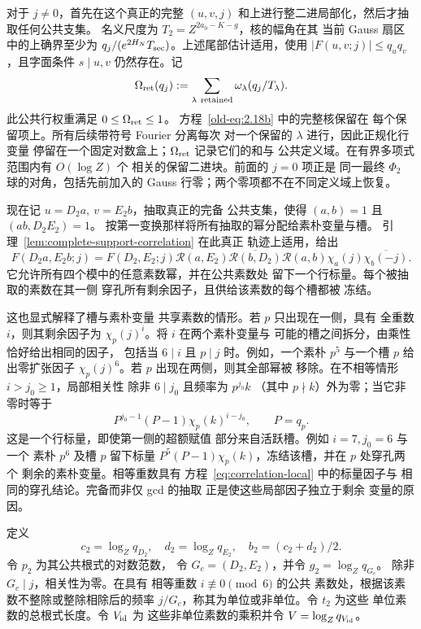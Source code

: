 对于 \(j\ne0\)，首先在这个真正的完整
\((u,v,j)\) 和上进行整二进局部化，然后才抽取任何公共支集。
名义尺度为
\(T_2=Z^{2a_0-K-g}\)，核的幅角在其
当前 Gauss 扇区中的上确界至少为
\(q_j/(e^{2H_N}T_{\rm sec})\)。上述尾部估计适用，使用
\(|F(u,v;j)|\le q_uq_v\)，且字面条件
\(s\mid u,v\) 仍然存在。记
\[
 \Omega_{\rm ret}(q_j)
 :=\sum_{\lambda\ {\rm retained}}\omega_\lambda(q_j/T_\lambda).
\]
此公共行权重满足 \(0\le\Omega_{\rm ret}\le1\)。
方程~\eqref{old-eq:2.18b} 中的完整核保留在
每个保留项上。所有后续带符号 Fourier 分离每次
对一个保留的 \(\lambda\) 进行，因此正规化行变量
停留在一个固定对数盒上；\(\Omega_{\rm ret}\) 记录它们的和与
公共定义域。在有界多项式范围内有 \(O(\log Z)\) 个
相关的保留二进块。前面的 \(j=0\) 项正是
同一最终 \(\Phi_2\) 球的对角，包括先前加入的
Gauss 行零；两个零项都不在不同定义域上恢复。

现在记 \(u=D_2a,\ v=E_2b\)，抽取真正的完备
公共支集，使得 \((a,b)=1\) 且 \((ab,D_2E_2)=1\)。
按第一变换那样将所有抽取的幂分配给素朴变量与槽。
引理~\ref{lem:complete-support-correlation} 在此真正
轨迹上适用，给出
\[
 F(D_2a,E_2b;j)=F(D_2,E_2;j)\mathcal R(a,E_2)
   \overline{\mathcal R(b,D_2)}\mathcal R(a,b)
   \chi_a(j)\overline{\chi_b(-j)}.
\]
它允许所有四个模中的任意素数幂，并在公共素数处
留下一个行标量。每个被抽取的素数在其一侧
穿孔所有剩余因子，且供给该素数的每个槽都被
冻结。

这也显式解释了槽与素朴变量
共享素数的情形。若 \(p\) 只出现在一侧，具有
全重数 \(i\)，则其剩余因子为
\(\chi_p(j)^i\)。将 \(i\) 在两个素朴变量与
可能的槽之间拆分，由乘性恰好给出相同的因子，
包括当 \(6\mid i\) 且 \(p\mid j\) 时。例如，一个素朴
\(p^5\) 与一个槽 \(p\) 给出零扩张因子
\(\chi_p(j)^6\)。若 \(p\) 出现在两侧，则其全部幂被
移除。在不相等情形 \(i>j_0\ge1\)，局部相关性
除非 \(6\mid j_0\) 且频率为 \(p^{j_0}k\)
（其中 \(p\nmid k\)）外为零；当它非零时等于
\[
 P^{j_0-1}(P-1)\chi_p(k)^{i-j_0},\qquad P=q_p.
\]
这是一个行标量，即使第一侧的超额赋值
部分来自活跃槽。例如 \(i=7,j_0=6\) 与一个
素朴 \(p^6\) 及槽 \(p\) 留下标量
\(P^5(P-1)\chi_p(k)\)，冻结该槽，并在 \(p\) 处穿孔两个
剩余的素朴变量。相等重数具有
方程~\eqref{eq:correlation-local} 中的标量因子与
相同的穿孔结论。完备而非仅 gcd 的抽取
正是使这些局部因子独立于剩余
变量的原因。

定义
\[
 c_2=\log_Zq_{D_2},\quad d_2=\log_Zq_{E_2},\quad
 b_2=(c_2+d_2)/2.
\]
令 \(p_2\) 为其公共根式的对数范数，
令 \(G_c=(D_2,E_2)\)，并令 \(g_2=\log_Zq_{G_c}\)。
除非 \(G_c\mid j\)，相关性为零。在具有
相等重数 \(i\not\equiv0\pmod6\) 的公共
素数处，根据该素数不整除或整除相除后的频率
\(j/G_c\)，称其为单位或非单位。令 \(t_2\) 为这些
单位素数的总根式长度。令 \(V_{\rm id}\) 为
这些非单位素数的乘积并令
\(V=\log_Zq_{V_{\rm id}}\)。

